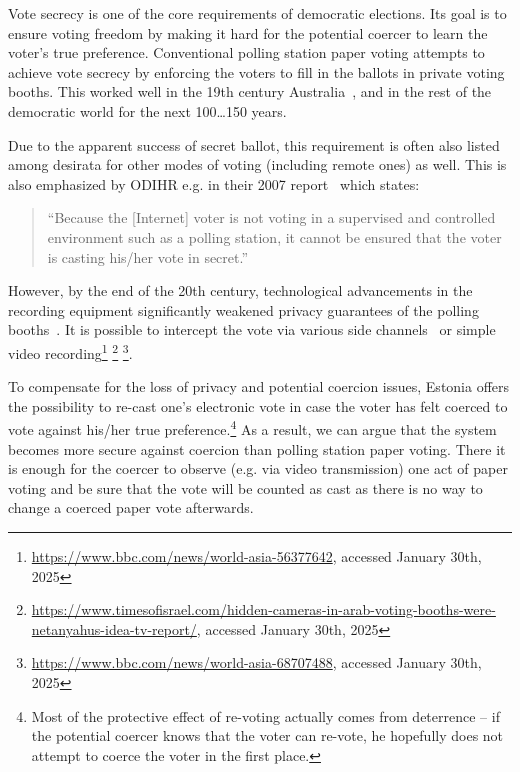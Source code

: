 \documentclass{llncs}
\begin{document}
Vote secrecy is one of the core requirements of democratic elections. Its goal is to ensure voting freedom by making it hard for the potential coercer to learn the voter's true preference. Conventional polling station paper voting attempts to achieve vote secrecy by enforcing the voters to fill in the ballots in private voting booths. This worked well in the 19th century Australia~\cite{brent2006australian}, and in the rest of the democratic world for the next 100\dots150 years. 

Due to the apparent success of secret ballot, this requirement is often also listed among desirata for other modes of voting (including remote ones) as well. This is also emphasized by ODIHR e.g. in their 2007 report~\cite{ODIHR2007} which states:
\begin{quote}
    ``Because the [Internet] voter is not voting in a supervised and controlled environment such as a polling station, it cannot be ensured that the voter is casting his/her vote in secret.''
\end{quote}


However, by the end of the 20th century, technological advancements in the recording equipment significantly weakened privacy guarantees of the polling booths~\cite{DBLP:conf/uss/Benaloh13}. It is possible to intercept the vote via various side channels~\cite{DBLP:conf/uss/CalandrinoC09,DBLP:journals/tissec/ToreiniSH17,DBLP:conf/voteid/KripsWV18,DBLP:conf/eurosp/KripsWV19} or simple video recording\footnote{\url{https://www.bbc.com/news/world-asia-56377642}, accessed January 30th, 2025} \footnote{\url{https://www.timesofisrael.com/hidden-cameras-in-arab-voting-booths-were-netanyahus-idea-tv-report/}, accessed January 30th, 2025} \footnote{\url{https://www.bbc.com/news/world-asia-68707488}, accessed January 30th, 2025}.

To compensate for the loss of privacy and potential coercion issues, Estonia offers the possibility to re-cast one's electronic vote in case the voter has felt coerced to vote against his/her true preference.\footnote{Most of the protective effect of re-voting actually comes from deterrence -- if the potential coercer knows that the voter can re-vote, he hopefully does not attempt to coerce the voter in the first place.} As a result, we can argue that the system becomes more secure against coercion than polling station paper voting. There it is enough for the coercer to observe (e.g. via video transmission) one act of paper voting and be sure that the vote will be counted as cast as there is no way to change a coerced paper vote afterwards. 
\end{document}
